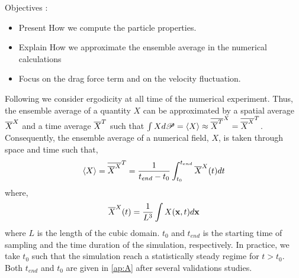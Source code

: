 Objectives : 
\begin{itemize}
    \item Present How we compute the particle properties. 
    \item Explain How we approximate the ensemble average in the numerical calculations
    \item Focus on the drag force term and on the velocity fluctuation. 
\end{itemize}

Following \citet{du2022analysis} we consider ergodicity at all time of the numerical experiment.
Thus, the ensemble average of a quantity $X$ can be approximated by a spatial average $\overline{X}^X$ and a time average $\overline{X}^T$ such that $\int X d\mathscr{P} = \left<X\right> \approx \overline{\overline{X}^T}^X = \overline{\overline{X}^X}^T$.
Consequently, the ensemble average of a numerical field, $X$, is taken through space and time such that,
\begin{equation}
    \left<X\right>
    = \overline{\overline{X}^X}^T
    = \frac{1}{ t_{end} - t_0}\int_{t_0}^{t_{end}} 
    \overline{X}^X(t) dt
\end{equation}
where, 
\begin{equation}
    \overline{X}^X(t)
    = \frac{1}{L^3}\int 
    X(\textbf{x},t) d\textbf{x}
\end{equation}
where $L$ is the length of the cubic domain.
$t_0$ and $t_{end}$ is the starting time of sampling and the time duration of the simulation, respectively.
In practice, we take $t_0$ such that the simulation reach a statistically steady regime for $t>t_0$.  
Both $t_{end} $ and $t_0$ are given in \ref{ap:A} after several validations studies. 

